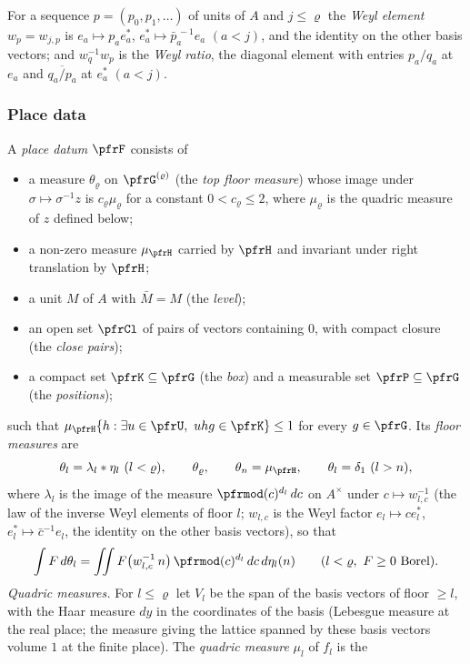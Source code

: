 \documentclass[10pt]{amsart}
\theoremstyle{definition}
\theoremstyle{remark}
\begin{document}
For a sequence $p=(p_0,p_1,\dots)$ of units of $A$ and $j\le\varrho$ the \emph{Weyl element}
$w_p=w_{j,p}$ is $e_a\mapsto p_ae^*_a$, $e_a^*\mapsto\bar p_a^{\,-1}e_a$ $(a<j)$, and the identity on the
other basis vectors; and $w_{q}^{-1}w_p$ is the \emph{Weyl ratio}, the diagonal element with entries
$p_a/q_a$ at $e_a$ and $\overline{q_a/p_a}$ at $e_a^*$ $(a<j)$.

\subsubsection*{Place data}
A \emph{place datum} $\pfrF$ consists of
\begin{itemize}
\item a measure $\theta_\varrho$ on $\pfrG^{(\varrho)}$ (the \emph{top floor measure}) whose image under
$\sigma\mapsto\sigma^{-1}z$ is $c_\varrho\mu_\varrho$ for a constant $0<c_\varrho\le2$, where $\mu_\varrho$ is the
quadric measure of $z$ defined below;
\item a non-zero measure $\mu_\pfrH$ carried by $\pfrH$ and invariant under right translation by
$\pfrH$;
\item a unit $M$ of $A$ with $\bar M=M$ (the \emph{level});
\item an open set $\pfrCl$ of pairs of vectors containing $0$, with compact closure (the \emph{close
pairs});
\item a compact set $\pfrK\subseteq\pfrG$ (the \emph{box}) and a measurable set $\pfrP\subseteq\pfrG$
(the \emph{positions});
\end{itemize}
such that $\mu_\pfrH\{h:\exists u\in\pfrU,\ uhg\in\pfrK\}\le1$ for every $g\in\pfrG$. Its
\emph{floor measures} are
\[
\theta_l=\lambda_l*\eta_l\ (l<\varrho),\qquad\theta_\varrho,\qquad\theta_{n}=\mu_\pfrH,\qquad
\theta_l=\delta_1\ (l>n),
\]
where $\lambda_l$ is the image of the measure $\pfrmod(c)^{d_l}\,dc$ on $A^\times$ under $c\mapsto w_{l,c}^{-1}$
(the law of the inverse Weyl elements of floor $l$; $w_{l,c}$ is the Weyl factor $e_l\mapsto ce_l^*$,
$e_l^*\mapsto\bar c^{-1}e_l$, the identity on the other basis vectors), so that
\[
\int F\,d\theta_l=\iint F\bigl(w_{l,c}^{-1}\,n\bigr)\,\pfrmod(c)^{d_l}\,dc\,d\eta_l(n)\qquad(l<\varrho,\ F\ge0\text{ Borel}).
\]
\emph{Quadric measures.} For $l\le\varrho$ let $V_l$ be the span of the basis vectors of floor $\ge l$, with the Haar
measure $dy$ in the coordinates of the basis (Lebesgue measure at the real place; the measure giving the lattice
spanned by these basis vectors volume $1$ at the finite place). The \emph{quadric measure} $\mu_l$ of $f_l$ is the
\end{document}
